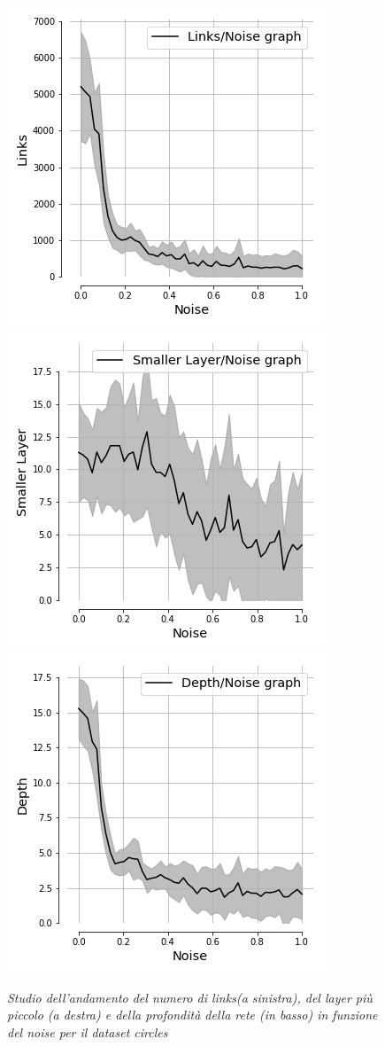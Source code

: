\documentclass[12pt,a4paper]{report}
\begin{document}
\begin{figure}[H]
 \centering
 \includegraphics[scale = 0.5]{images/links_noise_circles}
 \includegraphics[scale = 0.5]{images/small_noise_circles}
 \includegraphics[scale = 0.5]{images/depth_noise_circles}
 \caption {\textit{Studio dell'andamento del numero di links(a sinistra), del layer più piccolo (a destra) e della profondità della rete (in basso) in funzione del noise per il dataset circles}}
 \label{noisecircles}
\end{figure}
\end{document}
